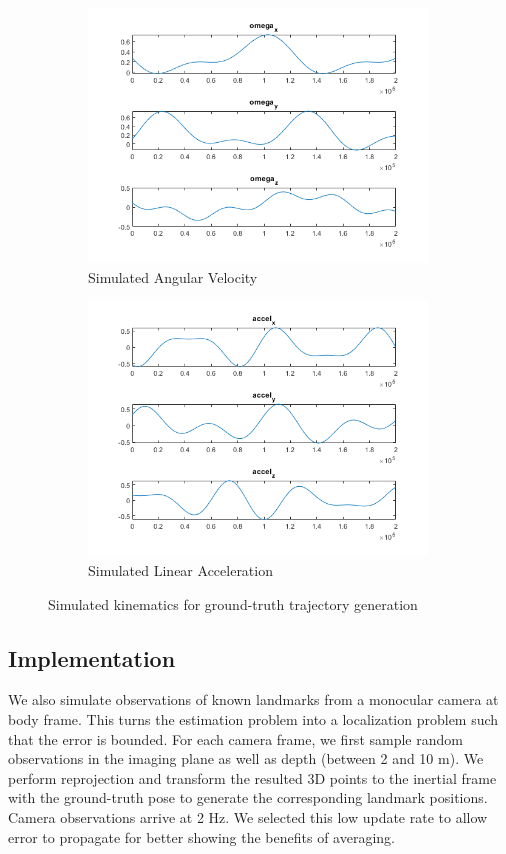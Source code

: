 \documentclass[conference]{IEEEtran}
\begin{document}
\begin{figure}[ht]
    \centering
    \begin{subfigure}[b]{0.45\linewidth}
        \centering
        \includegraphics[width=9cm]{figures/simulated_omega.png}
        \caption{Simulated Angular Velocity}
        \label{fig:omega}
    \end{subfigure}
    \begin{subfigure}[b]{0.45\linewidth}
        \centering
        \includegraphics[width=9cm]{figures/simulated_accel.png}
        \caption{Simulated Linear Acceleration}
        \label{fig:accel}
    \end{subfigure}
\caption{Simulated kinematics for ground-truth trajectory generation}
\label{fig:simulation_data}
\end{figure}

\subsection{Implementation}

We also simulate observations of known landmarks from a monocular camera at body frame. This turns the estimation problem into a localization problem such that the error is bounded. For each camera frame, we first sample random observations in the imaging plane as well as depth (between 2 and 10 m). We perform reprojection and transform the resulted 3D points to the inertial frame with the ground-truth pose to generate the corresponding landmark positions. Camera observations arrive at 2 Hz. We selected this low update rate to allow error to propagate for better showing the benefits of averaging.
\end{document}
